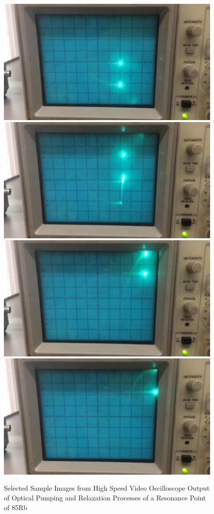 \documentclass{article}
\begin{document}
\begin{figure}[H]
    \includegraphics[scale = 0.08]{062.jpg}
    \includegraphics[scale = 0.08]{065.jpg}
    \includegraphics[scale = 0.08]{088.jpg}
    \includegraphics[scale = 0.08]{099.jpg}
    \caption{Selected Sample Images from High Speed Video Oscilloscope Output of Optical Pumping and Relaxation Processes of a Resonance Point of 85Rb}
    \label{fig:my_label}
\end{figure}
\end{document}
